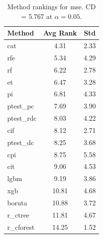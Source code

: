\begin{table}[h]
\centering
\caption{Method rankings for mse. CD = 5.767 at $\alpha=0.05$.}
\label{tab:ranks_mse}
\begin{tabular}{lcc}
\toprule
Method & Avg Rank & Std \\
\midrule
cat & 4.31 & 2.33 \\
rfe & 5.34 & 4.29 \\
rf & 6.22 & 2.78 \\
et & 6.47 & 3.28 \\
pi & 6.81 & 4.33 \\
ptest_pc & 7.69 & 3.90 \\
ptest_rdc & 8.03 & 4.22 \\
cif & 8.12 & 2.71 \\
ptest_dc & 8.25 & 3.68 \\
cpi & 8.75 & 5.58 \\
cit & 9.06 & 4.53 \\
lgbm & 9.19 & 3.86 \\
xgb & 10.81 & 4.68 \\
boruta & 10.88 & 3.72 \\
r_ctree & 11.81 & 4.67 \\
r_cforest & 14.25 & 1.52 \\
\bottomrule
\end{tabular}
\end{table}